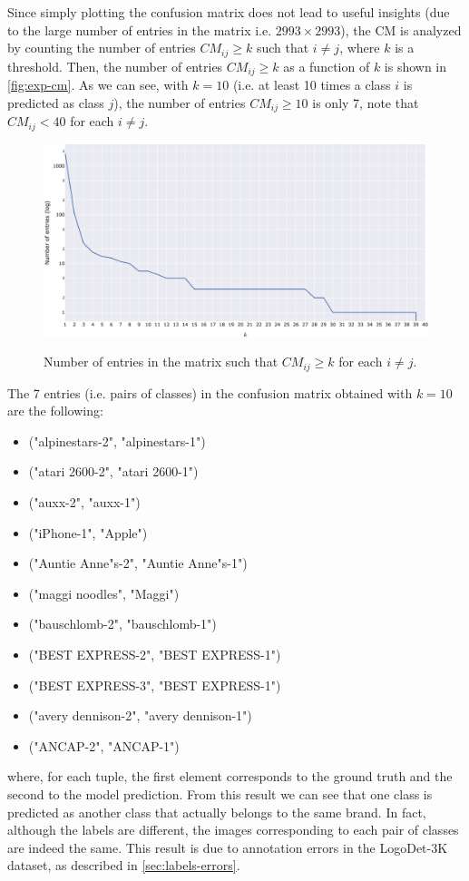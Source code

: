 Since simply plotting the confusion matrix does not lead to useful insights (due to the large number of entries in the matrix i.e. $2993 \times 2993$), the CM is analyzed by counting the number of entries $CM_{ij} \geq k$ such that $i \neq j$, where $k$ is a threshold.
Then, the number of entries $CM_{ij} \geq k$ as a function of $k$ is shown in \autoref{fig:exp-cm}.
As we can see, with $k=10$ (i.e. at least 10 times a class $i$ is predicted as class $j$), the number of entries $CM_{ij} \geq 10$ is only 7, note that $CM_{ij} < 40$ for each $i \neq j$.

\begin{figure}[H]
	\centering
    {\includegraphics[width=1\textwidth]{images/cm/cm_entry_plot.png} }%
    \caption{Number of entries in the matrix such that $CM_{ij} \geq k$ for each $i \neq j$.}
	\label{fig:exp-cm}
\end{figure}

The 7 entries (i.e. pairs of classes) in the confusion matrix obtained with $k=10$ are the following:
\begin{itemize}
    \item ("alpinestars-2", "alpinestars-1")
    \item ("atari 2600-2", "atari 2600-1")
    \item ("auxx-2", "auxx-1")
    \item ("iPhone-1", "Apple")
    \item ("Auntie Anne"s-2", "Auntie Anne"s-1")
    \item ("maggi noodles", "Maggi")
    \item ("bauschlomb-2", "bauschlomb-1")
    \item ("BEST EXPRESS-2", "BEST EXPRESS-1")
    \item ("BEST EXPRESS-3", "BEST EXPRESS-1")
    \item ("avery dennison-2", "avery dennison-1")
    \item ("ANCAP-2", "ANCAP-1")
\end{itemize}
where, for each tuple, the first element corresponds to the ground truth and the second to the model prediction.
From this result we can see that one class is predicted as another class that actually belongs to the same brand.
In fact, although the labels are different, the images corresponding to each pair of classes are indeed the same.
This result is due to annotation errors in the LogoDet-3K dataset, as described in \autoref{sec:labels-errors}.

